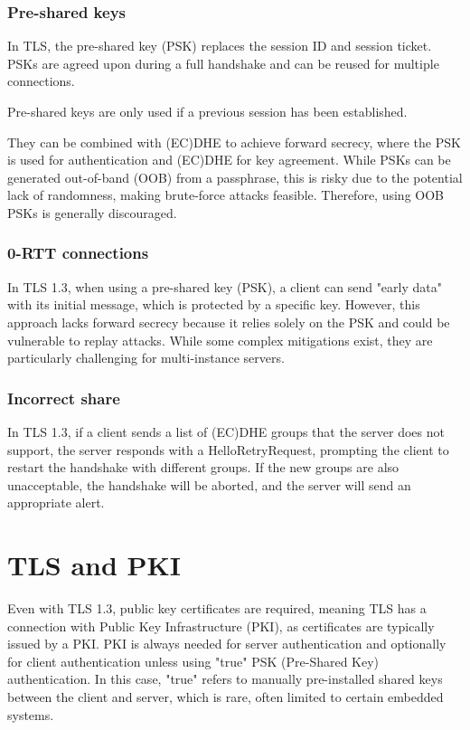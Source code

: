 \subsubsection{Pre-shared keys}
In TLS, the pre-shared key (PSK) replaces the session ID and session
ticket. PSKs are agreed upon during a full handshake and can be reused
for multiple connections.
\begin{boxH}
  Pre-shared keys are only used if a previous session has been 
  established.
\end{boxH}

They can be combined with (EC)DHE to achieve forward secrecy, where
the PSK is used for authentication and (EC)DHE for key agreement.
While PSKs can be generated out-of-band (OOB) from a passphrase, this
is risky due to the potential lack of randomness, making brute-force
attacks feasible. Therefore, using OOB PSKs is generally discouraged.

\subsubsection{0-RTT connections}
In TLS 1.3, when using a pre-shared key (PSK), a client can send
"early data" with its initial message, which is protected by a
specific key. However, this approach lacks forward secrecy because it
relies solely on the PSK and could be vulnerable to replay attacks.
While some complex mitigations exist, they are particularly
challenging for multi-instance servers.

\subsubsection{Incorrect share}
In TLS 1.3, if a client sends a list of (EC)DHE groups that the server
does not support, the server responds with a HelloRetryRequest,
prompting the client to restart the handshake with different groups.
If the new groups are also unacceptable, the handshake will be
aborted, and the server will send an appropriate alert.

\section{TLS and PKI}
Even with TLS 1.3, public key certificates are required, meaning TLS
has a connection with Public Key Infrastructure (PKI), as certificates
are typically issued by a PKI. PKI is always needed for server
authentication and optionally for client authentication unless using
"true" PSK (Pre-Shared Key) authentication. In this case, "true"
refers to manually pre-installed shared keys between the client and
server, which is rare, often limited to certain embedded systems.

